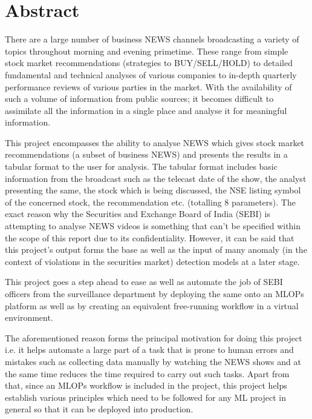 \chapter*{Abstract}

There are a large number of business NEWS channels broadcasting a variety of topics throughout morning and evening primetime. These range from simple stock market recommendations (strategies to BUY/SELL/HOLD) to detailed fundamental and technical analyses of various companies to in-depth quarterly performance reviews of various parties in the market. With the availability of such a volume of information from public sources; it becomes difficult to assimilate all the information in a single place and analyse it for meaningful information. \par

This project encompasses the ability to analyse NEWS which gives stock market recommendations (a subset of business NEWS) and presents the results in a tabular format to the user for analysis. The tabular format includes basic information from the broadcast such as the telecast date of the show, the analyst presenting the same, the stock which is being discussed, the NSE listing symbol of the concerned stock, the recommendation etc. (totalling 8 parameters). The exact reason why the Securities and Exchange Board of India (SEBI) is attempting to analyse NEWS videos is something that can’t be specified within the scope of this report due to its confidentiality. However, it can be said that this project’s output forms the base as well as the input of many anomaly (in the context of violations in the securities market) detection models at a later stage. \par

This project goes a step ahead to ease as well as automate the job of SEBI officers from the surveillance department by deploying the same onto an MLOPs platform as well as by creating an equivalent free-running workflow in a virtual environment. \par

The aforementioned reason forms the principal motivation for doing this project i.e. it helps automate a large part of a task that is prone to human errors and mistakes such as collecting data manually by watching the NEWS shows and at the same time reduces the time required to carry out such tasks. Apart from that, since an MLOPs workflow is included in the project, this project helps establish various principles which need to be followed for any ML project in general so that it can be deployed into production.
